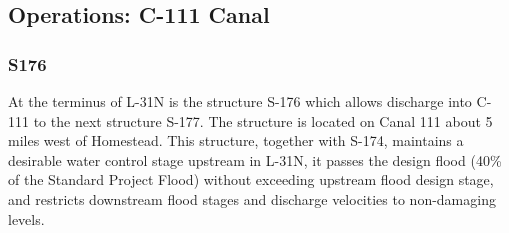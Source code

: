 %
%



\clearpage
\subsection{Operations: C-111 Canal}

\subsubsection{S176}
At the terminus of L-31N is the structure S-176 which allows discharge into C-111 to the next structure S-177.
The structure is located on Canal 111 about 5 miles west of Homestead. This structure, together with S-174, maintains a desirable water control stage upstream in L-31N, it passes the design flood (40\% of the Standard Project Flood) without exceeding upstream flood design stage, and restricts downstream flood stages and discharge velocities to non-damaging levels.


